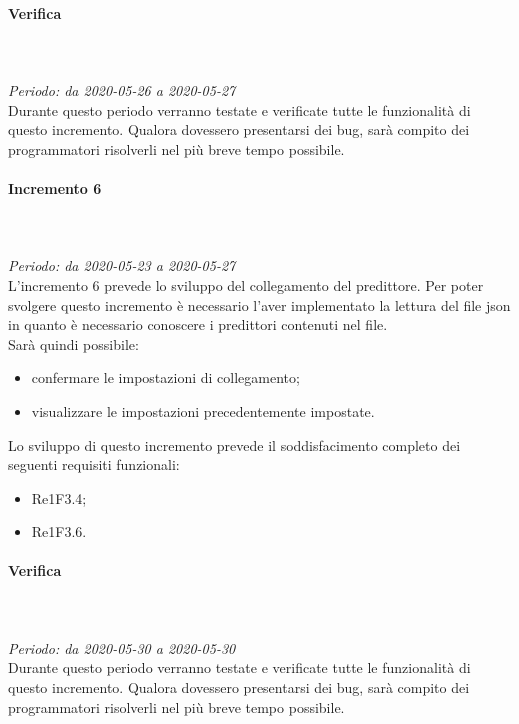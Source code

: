 \paragraph*{Verifica}\mbox{} \\ \mbox{} \\ 
\textit{Periodo: da 2020-05-26 a 2020-05-27}\\
Durante questo periodo verranno testate e verificate tutte le funzionalità di questo incremento. Qualora dovessero presentarsi dei bug, sarà compito dei programmatori risolverli nel più breve tempo possibile.

\paragraph{Incremento 6}\mbox{} \\ \mbox{} \\ 
\textit{Periodo: da 2020-05-23 a 2020-05-27}\\
L’incremento 6 prevede lo sviluppo del collegamento del predittore. Per poter svolgere questo incremento è necessario l'aver implementato la lettura del file json in quanto è necessario conoscere i predittori contenuti nel file. \\
Sarà quindi possibile:
\begin{itemize}
	\item confermare le impostazioni di collegamento;
	\item visualizzare le impostazioni precedentemente impostate.
\end{itemize}
Lo sviluppo di questo incremento prevede il soddisfacimento completo dei seguenti requisiti funzionali:
\begin{itemize}
\item Re1F3.4;
\item Re1F3.6.
\end{itemize}
\paragraph*{Verifica}\mbox{} \\ \mbox{} \\ 
\textit{Periodo: da 2020-05-30 a 2020-05-30}\\
Durante questo periodo verranno testate e verificate tutte le funzionalità di questo incremento. Qualora dovessero presentarsi dei bug, sarà compito dei programmatori risolverli nel più breve tempo possibile.

